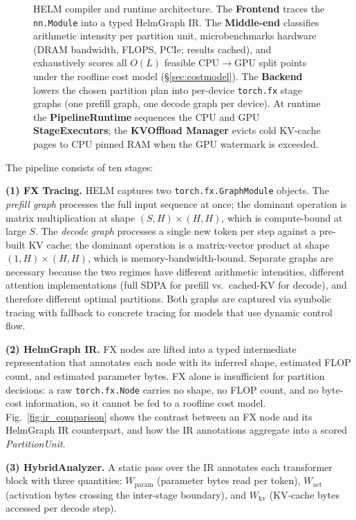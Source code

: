 \documentclass[lettersize,journal]{IEEEtran}
\begin{document}
\begin{figure}[!t]
\begin{tikzpicture}
\end{tikzpicture}
\caption{HELM compiler and runtime architecture.
The \textbf{Frontend} traces the \texttt{nn.Module} into a typed HelmGraph IR.
The \textbf{Middle-end} classifies arithmetic intensity per partition unit,
microbenchmarks hardware (DRAM bandwidth, FLOPS, PCIe; results cached), and
exhaustively scores all $O(L)$ feasible CPU$\to$GPU split points under the
roofline cost model (\S\ref{sec:costmodel}).
The \textbf{Backend} lowers the chosen partition plan into per-device
\texttt{torch.fx} stage graphs (one prefill graph, one decode graph per device).
At runtime the \textbf{PipelineRuntime} sequences the CPU and GPU
\textbf{StageExecutors}; the \textbf{KVOffload Manager} evicts cold KV-cache
pages to CPU pinned RAM when the GPU watermark is exceeded.}
\label{fig:pipeline}
\end{figure}

The pipeline consists of ten stages:

\textbf{(1) FX Tracing.} HELM captures two \texttt{torch.fx.GraphModule}
objects. The \emph{prefill graph} processes the full input sequence at once;
the dominant operation is matrix multiplication at shape $(S, H) \times
(H, H)$, which is compute-bound at large $S$. The \emph{decode graph}
processes a single new token per step against a pre-built KV cache; the
dominant operation is a matrix-vector product at shape $(1, H) \times (H,
H)$, which is memory-bandwidth-bound. Separate graphs are necessary because
the two regimes have different arithmetic intensities, different attention
implementations (full SDPA for prefill vs.\ cached-KV for decode), and
therefore different optimal partitions. Both graphs are captured via symbolic
tracing with fallback to concrete tracing for models that use dynamic control
flow.

\textbf{(2) HelmGraph IR.} FX nodes are lifted into a typed intermediate
representation that annotates each node with its inferred shape, estimated
FLOP count, and estimated parameter bytes.
FX alone is insufficient for partition decisions: a raw \texttt{torch.fx.Node}
carries no shape, no FLOP count, and no byte-cost information, so it cannot
be fed to a roofline cost model.
Fig.~\ref{fig:ir_comparison} shows the contrast between an FX node and its
HelmGraph IR counterpart, and how the IR annotations aggregate into a
scored \emph{PartitionUnit}.

\textbf{(3) HybridAnalyzer.} A static pass over the IR annotates each
transformer block with three quantities: $W_\text{param}$ (parameter bytes
read per token), $W_\text{act}$ (activation bytes crossing the inter-stage
boundary), and $W_\text{kv}$ (KV-cache bytes accessed per decode step).
\end{document}
